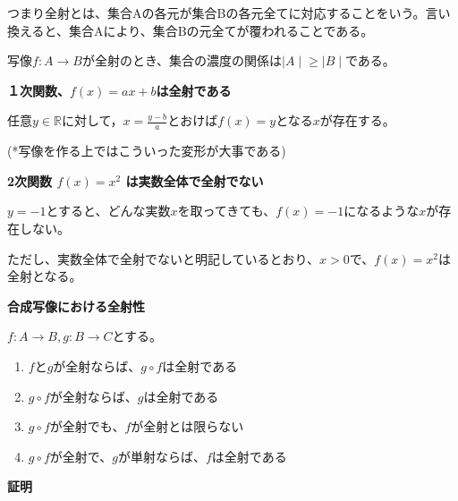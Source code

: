 \documentclass[dvipdfmx,autodetect-engine]{jsarticle}
\begin{document}
つまり全射とは、集合Aの各元が集合Bの各元全てに対応することをいう。言い換えると、集合Aにより、集合Bの元全てが覆われることである。

写像$f: A \to B$が全射のとき、集合の濃度の関係は${\mid A \mid} \geq {\mid B \mid}$である。

\exam

{\bf １次関数、$f(x) = ax+b$は全射である}

任意$y \in \mathbb{R}$に対して，$x = \frac{y-b}{a}$とおけば$f(x) = y$となる$x$が存在する。

(*写像を作る上ではこういった変形が大事である)


\exam
{\bf 2次関数 $f(x)=x^2$ は実数全体で全射でない}

$y=-1$とすると、どんな実数$x$を取ってきても、$f(x) = -1$になるような$x$が存在しない。

ただし、実数全体で全射でないと明記しているとおり、$x > 0$で、$f(x)=x^2$は全射となる。


\prop

 {\bf 合成写像における全射性 }
 
 $f:A \to B, g: B \to C$とする。

\begin{enumerate}
\renewcommand{\labelenumi}{(\arabic{enumi})}
	\item $f$と$g$が全射ならば、$g \circ f$は全射である
	\item $g \circ f$が全射ならば、$g$は全射である
	\item $g \circ f$が全射でも、$f$が全射とは限らない
	\item $g \circ f$が全射で、$g$が単射ならば、$f$は全射である
\end{enumerate}

{ \bf 証明}
\end{document}
